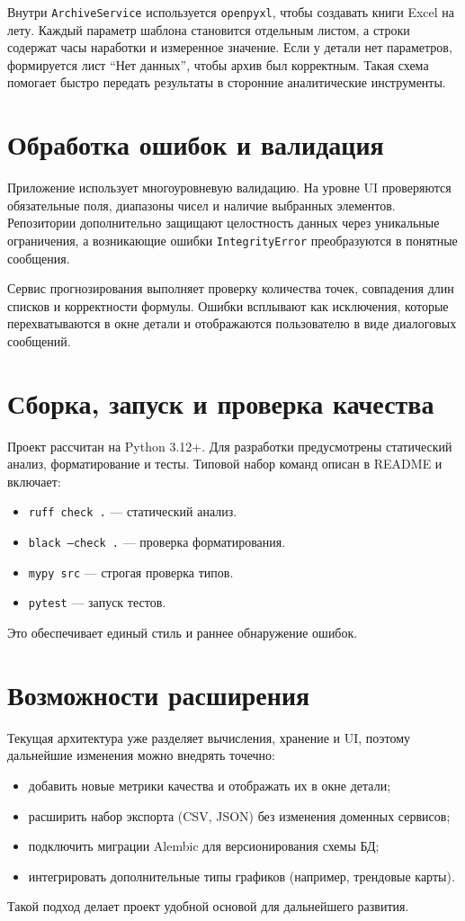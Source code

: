 \documentclass[12pt,a4paper]{article}
\begin{document}
Внутри \texttt{ArchiveService} используется \texttt{openpyxl}, чтобы создавать
книги Excel на лету. Каждый параметр шаблона становится отдельным листом,
а строки содержат часы наработки и измеренное значение. Если у детали нет
параметров, формируется лист ``Нет данных'', чтобы архив был корректным.
Такая схема помогает быстро передать результаты в сторонние аналитические инструменты.

\section*{Обработка ошибок и валидация}
Приложение использует многоуровневую валидацию. На уровне UI проверяются
обязательные поля, диапазоны чисел и наличие выбранных элементов.
Репозитории дополнительно защищают целостность данных через уникальные ограничения,
а возникающие ошибки \texttt{IntegrityError} преобразуются в понятные сообщения.

Сервис прогнозирования выполняет проверку количества точек, совпадения длин списков
и корректности формулы. Ошибки всплывают как исключения, которые перехватываются
в окне детали и отображаются пользователю в виде диалоговых сообщений.

\section*{Сборка, запуск и проверка качества}
Проект рассчитан на Python 3.12+. Для разработки предусмотрены статический анализ,
форматирование и тесты. Типовой набор команд описан в README и включает:
\begin{itemize}
  \item \texttt{ruff check .} --- статический анализ.
  \item \texttt{black --check .} --- проверка форматирования.
  \item \texttt{mypy src} --- строгая проверка типов.
  \item \texttt{pytest} --- запуск тестов.
\end{itemize}
Это обеспечивает единый стиль и раннее обнаружение ошибок.

\section*{Возможности расширения}
Текущая архитектура уже разделяет вычисления, хранение и UI, поэтому
дальнейшие изменения можно внедрять точечно:
\begin{itemize}
  \item добавить новые метрики качества и отображать их в окне детали;
  \item расширить набор экспорта (CSV, JSON) без изменения доменных сервисов;
  \item подключить миграции Alembic для версионирования схемы БД;
  \item интегрировать дополнительные типы графиков (например, трендовые карты).
\end{itemize}
Такой подход делает проект удобной основой для дальнейшего развития.
\end{document}
